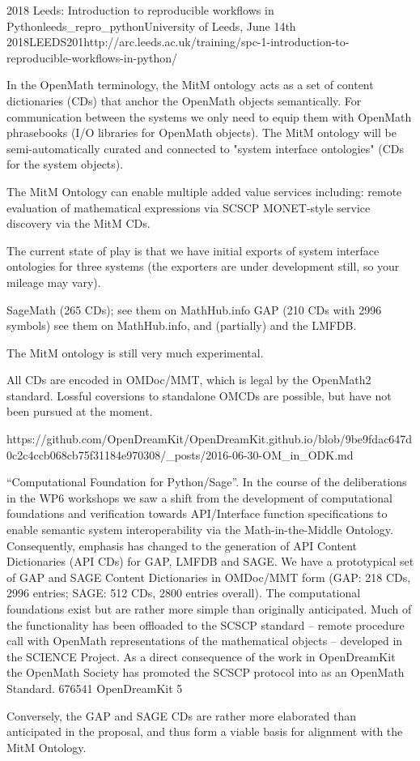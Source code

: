 \begin{Aim 1}
\begin{Aim 2}
\begin{event}{2018 Leeds: Introduction to reproducible workflows in Python}{leeds_repro_python}{University of Leeds, June 14th 
     2018}{LEEDS}{20}{1}{http://arc.leeds.ac.uk/training/spc-1-introduction-to-reproducible-workflows-in-python/}
\begin{itemize}
In the OpenMath terminology, the MitM ontology acts as a set of content dictionaries (CDs) that anchor the OpenMath objects semantically. 
For communication between the systems we only need to equip them with OpenMath phrasebooks (I/O libraries for OpenMath objects). The MitM 
ontology will be semi-automatically curated and connected to "system interface ontologies" (CDs for the system objects).

The MitM Ontology can enable multiple added value services including:
    remote evaluation of mathematical expressions via SCSCP
    MONET-style service discovery via the MitM CDs.

The current state of play is that we have initial exports of system interface ontologies for three systems (the exporters are under development still, so your mileage may vary).

    SageMath (265 CDs); see them on MathHub.info
    GAP (210 CDs with 2996 symbols) see them on MathHub.info, and
    (partially) and the LMFDB.

The MitM ontology is still very much experimental.

All CDs are encoded in OMDoc/MMT, which is legal by the OpenMath2 standard. Lossful coversions to standalone OMCDs are possible, but have not been pursued at the moment.

https://github.com/OpenDreamKit/OpenDreamKit.github.io/blob/9be9fdac647d0c2c4ccb068cb75f31184e970308/_posts/2016-06-30-OM_in_ODK.md


“Computational Foundation for Python/Sage”. 
In the course of the deliberations in the WP6 workshops we saw a shift from the development of computational foundations and verification towards API/Interface function specifications to enable semantic system interoperability via the Math-in-the-Middle Ontology. Consequently, emphasis has changed to the generation of API Content Dictionaries (API CDs) for GAP, LMFDB and SAGE. We have a prototypical set of GAP and SAGE Content Dictionaries in OMDoc/MMT form (GAP: 218 CDs, 2996 entries; SAGE: 512 CDs, 2800 entries overall). The computational foundations exist but are rather more simple than originally anticipated. Much of the functionality has been offloaded to the SCSCP standard – remote procedure call with OpenMath representations of the mathematical objects – developed in the SCIENCE Project. As a direct consequence of the work in OpenDreamKit the OpenMath Society has promoted the SCSCP protocol into as an OpenMath Standard. 676541 OpenDreamKit 5

Conversely, the GAP and SAGE CDs are rather more elaborated than anticipated in the proposal, and thus form a viable basis for alignment with the MitM Ontology.


\end{itemize}
\end{event}
\end{Aim 2}
\end{Aim 1}
